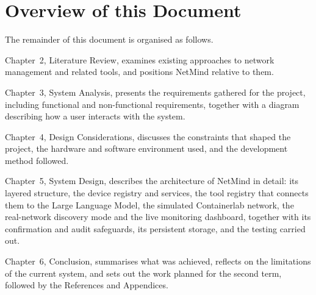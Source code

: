 \section{Overview of this Document}

The remainder of this document is organised as follows.

Chapter~2, Literature Review, examines existing approaches to network
management and related tools, and positions NetMind relative to them.

Chapter~3, System Analysis, presents the requirements gathered for the
project, including functional and non-functional requirements, together with
a diagram describing how a user interacts with the system.

Chapter~4, Design Considerations, discusses the constraints that shaped the
project, the hardware and software environment used, and the development
method followed.

Chapter~5, System Design, describes the architecture of NetMind in detail:
its layered structure, the device registry and services, the tool registry
that connects them to the Large Language Model, the simulated Containerlab
network, the real-network discovery mode and the live monitoring dashboard,
together with its confirmation and audit safeguards, its persistent storage,
and the testing carried out.

Chapter~6, Conclusion, summarises what was achieved, reflects on the
limitations of the current system, and sets out the work planned for the
second term, followed by the References and Appendices.
